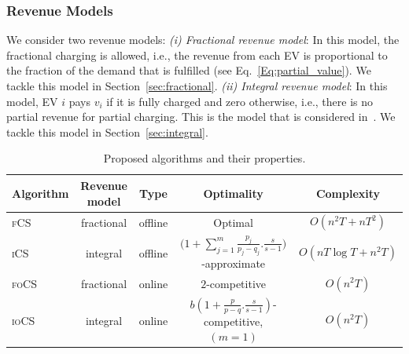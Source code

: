 \documentclass[journal]{IEEEtran}
\newcommand{\rev}[1]{{\color{black}#1}}%
\newcommand{\rev}[1]{#1}
\newcommand{\ics}{\textsc{iCS}\xspace}
\newcommand{\fcs}{\textsc{fCS}\xspace}
\newcommand{\focs}{\textsc{foCS}\xspace}
\newcommand{\iocs}{\textsc{ioCS}\xspace}
\begin{document}
\subsubsection{Revenue Models\label{sec:irm}} We consider two revenue models: 
\textit{(i) Fractional revenue model}: In this model, the fractional charging is allowed, i.e., the revenue from each EV is proportional to the fraction of the demand that is fulfilled \cite{Xiang} (see Eq.~\eqref{Eq:partial_value}). We tackle this model in Section~\ref{sec:fractional}.
\textit{(ii) Integral revenue model}: \rev{In this model, EV $i$ pays $v_i$ if it is fully charged and zero otherwise, i.e., there is no partial revenue for partial charging. }
This is the model that is considered in~\cite{WTang,Shroff2014}. We tackle this model in Section~\ref{sec:integral}.
		
		
		
			\begin{table}[!t]
			\centering
			\caption{Proposed algorithms and their properties.}
			\label{tbl:algs}
			\begin{tabular}{ | l | c | c | c |c|}
				\hline
				\textbf{Algorithm} & \textbf{Revenue model} & \textbf{Type} & \textbf{Optimality} & \textbf{Complexity} \\ \hline\hline    
				\fcs& fractional& offline& Optimal & $O(n^2T+nT^2)$\\\hline 
				\ics& integral& offline& ${\Big( 1+\sum_{j=1}^m {\frac{p_j}{p_j-q_j}}.\frac{s}{s-1}\Big)}$-approximate & $O(nT\log T+n^2T)$ \\\hline 
				\focs & fractional& online& $2$-competitive & $O(n^2T)$\\\hline 
				\iocs& integral&  online& $b(1+\frac{p}{p-q}.\frac{s}{s-1})$-competitive, $(m=1)$ & $O(n^2T)$\\\hline
			\end{tabular}
		\end{table}
		
\end{document}
